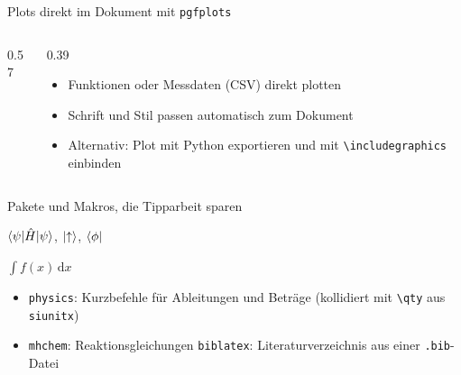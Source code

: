 \begin{frame}{Plots direkt im Dokument mit \texttt{pgfplots}}
  \begin{columns}[c]
    \begin{column}{0.57\textwidth}
      \begin{bildkarte}
      \end{bildkarte}
    \end{column}
    \begin{column}{0.39\textwidth}
      \begin{itemize}
        \item Funktionen oder Messdaten (CSV) direkt plotten
        \item Schrift und Stil passen automatisch zum Dokument
        \item Alternativ: Plot mit Python exportieren und mit \texttt{\textbackslash includegraphics} einbinden
      \end{itemize}
    \end{column}
  \end{columns}
\end{frame}

\begin{frame}[fragile]{Pakete und Makros, die Tipparbeit sparen}
\begin{codeerg}
$\braket{\psi | \hat{H} | \psi}$,
$\ket{\uparrow}$, $\bra{\phi}$

\newcommand{\dd}[1]{\,\mathrm{d}#1}
$\int f(x) \dd{x}$
\end{codeerg}
  \vspace{0.5em}
  \begin{itemize}
    \item \texttt{physics}: Kurzbefehle für Ableitungen und Beträge (kollidiert mit \texttt{\textbackslash qty} aus \texttt{siunitx})
    \item \texttt{mhchem}: Reaktionsgleichungen \quad \texttt{biblatex}: Literaturverzeichnis aus einer \texttt{.bib}-Datei
  \end{itemize}
\end{frame}
